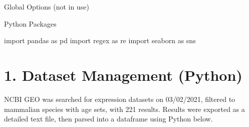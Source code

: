 \documentclass[
]{article}
\newenvironment{Shaded}{\begin{snugshade}}{\end{snugshade}}
\newcommand{\ImportTok}[1]{#1}
\newcommand{\NormalTok}[1]{#1}
\begin{document}
Global Options (not in use)

Python Packages

\begin{Shaded}
\begin{Highlighting}[]
\ImportTok{import}\NormalTok{ pandas }\ImportTok{as}\NormalTok{ pd}
\ImportTok{import}\NormalTok{ regex }\ImportTok{as}\NormalTok{ re}
\ImportTok{import}\NormalTok{ seaborn }\ImportTok{as}\NormalTok{ sns}
\end{Highlighting}
\end{Shaded}

\hypertarget{dataset-management-python}{%
\section{1. Dataset Management
(Python)}\label{dataset-management-python}}

NCBI GEO was searched for expression datasets on 03/02/2021, filtered to
mammalian species with age sets, with 221 results. Results were exported
as a detailed text file, then parsed into a dataframe using Python
below.
\end{document}
